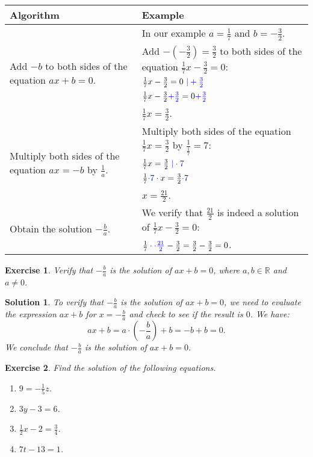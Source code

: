 \documentclass[12pt]{article}
\newtheorem{ex}{Exercise}[section]
\newtheorem{sol}[prop]{Solution}
\begin{document}
\begin{table*}[h!]
\centering
\begin{tabular}{ l | l }
Algorithm & Example \\
\hline
\multirow{5}{16em}{Add $-b$ to both sides of the equation $ax+b=0$.}. & In our example $a=\frac{1}{7}$ and $b=-\frac{3}{2}$.\\
	 & Add $-(-\frac{3}{2})=\frac{3}{2}$ to both sides of the equation $\frac{1}{7}x-\frac{3}{2}=0$:\\
      & $\frac{1}{7}x-\frac{3}{2}=0 \textcolor{blue}{\ | + \frac{3}{2}}$\\
      & $\frac{1}{7}x-\frac{3}{2} \textcolor{blue}{+ \frac{3}{2}}=0 \textcolor{blue}{+ \frac{3}{2}}$\\
      & $\frac{1}{7}x=\frac{3}{2}$.
\\\hline
\multirow{4}{16em}{Multiply both sides of the equation $ax=-b$ by $\frac{1}{a}$.} & Multiply both sides of the equation $\frac{1}{7}x=\frac{3}{2}$ by $\frac{1}{\frac{1}{7}}=7$:\\
      & $\frac{1}{7}x=\frac{3}{2} \textcolor{blue}{\ | \cdot 7}$\\
      & $\frac{1}{7} \textcolor{blue}{\cdot 7}\cdot x=\frac{3}{2} \textcolor{blue}{\cdot 7}$\\
      & $x=\frac{21}{2}$. \\\hline
\multirow{2}{16em}{Obtain the solution $-\frac{b}{a}$.}& We verify that  $\frac{21}{2}$ is indeed a solution of $\frac{1}{7}x-\frac{3}{2}=0$:\\
       & $\frac{1}{7}\cdot \textcolor{blue}{\cdot \frac{21}{2}}-\frac{3}{2}=\frac{3}{2}-\frac{3}{2}=0$.
\\\hline
\end{tabular}
\end{table*}

\newpage
\begin{ex}
Verify that $-\frac{b}{a}$ is the solution of $ax+b=0$, where $a, b\in \mathbb{R}$ and $a\neq 0$.
\end{ex}

\begin{sol}
To verify that $-\frac{b}{a}$ is the solution of $ax+b=0$, we need to evaluate the expression $ax+b$ for $x=-\frac{b}{a}$ and check to see if the result is $0$. We have:
$$ax+b= a\cdot(-\frac{b}{a})+b=-b+b=0.$$
We conclude that $-\frac{b}{a}$ is the solution of $ax+b=0$.
\end{sol}

\begin{ex}
Find the solution of the following equations.
\begin{enumerate}
\item[a)] $9=-\frac{1}{5}z$.
\item[b)] $3y-3=6$.
\item[c)] $\frac{1}{2}x-2=\frac{3}{4}$.
\item[d)] $7t-13=1$.
\end{enumerate}
\end{ex}
\end{document}
